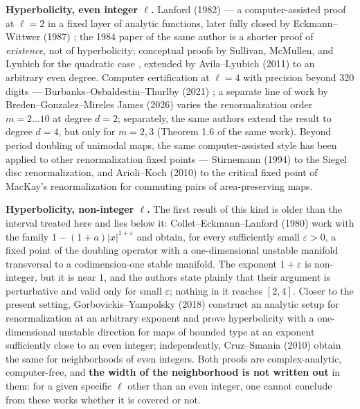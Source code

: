 \textbf{Hyperbolicity, even integer $\ell$.} Lanford (1982) \cite{lanford1982computer} --- a computer-assisted
proof at $\ell = 2$ in a fixed layer of analytic functions, later
fully closed by Eckmann--Wittwer (1987) \cite{eckmann1987complete}; the 1984 paper of the
same author \cite{lanford1984shorter} is a shorter proof of \emph{existence}, not of
hyperbolicity; conceptual proofs by Sullivan,
McMullen, and Lyubich for the quadratic case
\cite{sullivan1992bounds, mcmullen1994complex, lyubich1999feigenbaum}, extended by
Avila--Lyubich (2011) \cite{avila2011full} to an arbitrary even degree.
Computer certification at $\ell = 4$ with precision beyond 320 digits ---
Burbanks--Osbaldestin--Thurlby (2021) \cite{burbanks2021rigorous}; a separate line of work by
Breden--Gonzalez--Mireles James (2026) \cite{breden2024validated} varies the renormalization order
$m = 2\dots 10$ at degree $d=2$; separately, the same authors extend the result
to degree $d=4$, but only for $m=2,3$ (Theorem 1.6 of the same work).
Beyond period doubling of unimodal maps, the same computer-assisted style has
been applied to other renormalization fixed points --- Stirnemann (1994)
\cite{stirnemann1994siegel} to the Siegel disc renormalization, and
Arioli--Koch (2010) \cite{arioli2010critical} to the critical fixed point of
MacKay's renormalization for commuting pairs of area-preserving maps.

\textbf{Hyperbolicity, non-integer $\ell$.} The first result of this kind is older than the
interval treated here and lies below it: Collet--Eckmann--Lanford (1980)
\cite{collet1980universal} work with the family $1-(1+a)|x|^{1+\varepsilon}$ and obtain, for
every sufficiently small $\varepsilon > 0$, a fixed point of the doubling operator with a
one-dimensional unstable manifold transversal to a codimension-one stable manifold. The
exponent $1+\varepsilon$ is non-integer, but it is near $1$, and the authors state plainly
that their argument is perturbative and valid only for small $\varepsilon$; nothing in it
reaches $[2,4]$. Closer to the present setting,
Gorbovickis--Yampolsky (2018) \cite{gorbovickis2018renormalization} construct
an analytic setup for renormalization at an arbitrary exponent and
prove hyperbolicity with a one-dimensional unstable direction for
maps of bounded type at an exponent sufficiently close to an
even integer; independently, Cruz--Smania (2010) \cite{cruz2010renormalization} obtain the same for
neighborhoods of even integers. Both proofs are complex-analytic, computer-free,
and \textbf{the width of the neighborhood is not written out} in them: for a given specific
$\ell$ other than an even integer, one cannot conclude from these works whether it is
covered or not.

